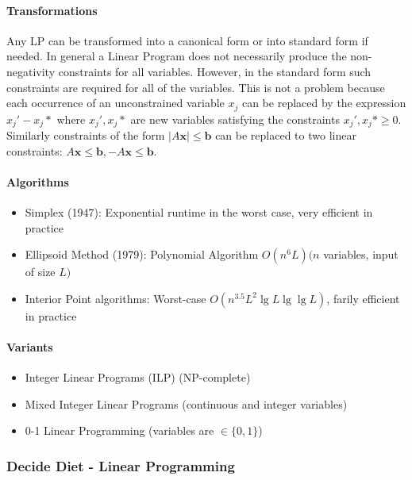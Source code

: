 \paragraph{Transformations}
Any LP can be transformed into a canonical form or into standard form if needed. In general a Linear Program does not necessarily produce the non-negativity constraints for all variables. However, in the standard form such constraints are required for all of the variables. This is not a problem because each occurrence of an unconstrained variable \(x_j\) can be replaced by the expression \(x_j'-x_j*\) where \(x_j', x_j*\) are new variables satisfying the constraints \(x_j', x_j* \geq 0\). Similarly constraints of the form \(|A\textbf{x}| \leq \textbf{b}\) can be replaced to two linear constraints: \(A\textbf{x} \leq \textbf{b} , -A\textbf{x} \leq \textbf{b}\).

\paragraph{Algorithms}
\begin{itemize}
    \item Simplex (1947): Exponential runtime in the worst case, very efficient in practice 
    \item Ellipsoid Method (1979): Polynomial Algorithm \(O(n^6L) (n\) variables, input of size \(L)\)
    \item Interior Point algorithms: Worst-case \(O(n^{3.5}L^2\lg L \lg \lg L)\), farily efficient in practice 
\end{itemize}

\paragraph{Variants}
\begin{itemize}
    \item Integer Linear Programs (ILP) (NP-complete)
    \item Mixed Integer Linear Programs (continuous and integer variables)
    \item 0-1 Linear Programming (variables are \(\in \{0, 1\}\))
\end{itemize}

\subsubsection{Decide Diet - Linear Programming}
